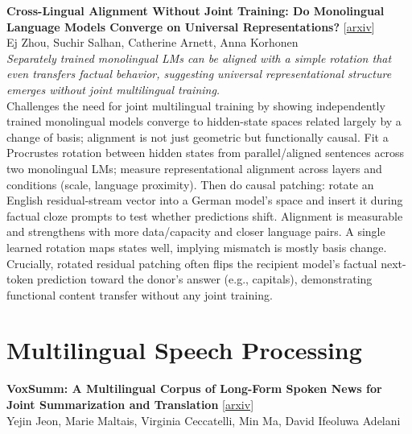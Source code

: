 \documentclass[12pt,letterpaper]{article}
\begin{document}
\medskip

{\small\textbf{Cross-Lingual Alignment Without Joint Training: Do Monolingual Language Models Converge on Universal Representations?}} {\scriptsize[\href{https://arxiv.org/abs/2608.27115}{arxiv}]}\\
{\scriptsize Ej Zhou, Suchir Salhan, Catherine Arnett, Anna Korhonen}\\

{\small\textit{Separately trained monolingual LMs can be aligned with a simple rotation that even transfers factual behavior, suggesting universal representational structure emerges without joint multilingual training.}}\\[1pt]
{\footnotesize Challenges the need for joint multilingual training by showing independently trained monolingual models converge to hidden-state spaces related largely by a change of basis; alignment is not just geometric but functionally causal. Fit a Procrustes rotation between hidden states from parallel/aligned sentences across two monolingual LMs; measure representational alignment across layers and conditions (scale, language proximity). Then do causal patching: rotate an English residual-stream vector into a German model's space and insert it during factual cloze prompts to test whether predictions shift. Alignment is measurable and strengthens with more data/capacity and closer language pairs. A single learned rotation maps states well, implying mismatch is mostly basis change. Crucially, rotated residual patching often flips the recipient model's factual next-token prediction toward the donor's answer (e.g., capitals), demonstrating functional content transfer without any joint training.}

\medskip


\section*{Multilingual Speech Processing}

{\small\textbf{VoxSumm: A Multilingual Corpus of Long-Form Spoken News for Joint Summarization and Translation}} {\scriptsize[\href{https://arxiv.org/abs/2608.10359}{arxiv}]}\\
{\scriptsize Yejin Jeon, Marie Maltais, Virginia Ceccatelli, Min Ma, David Ifeoluwa Adelani}\\
\end{document}
